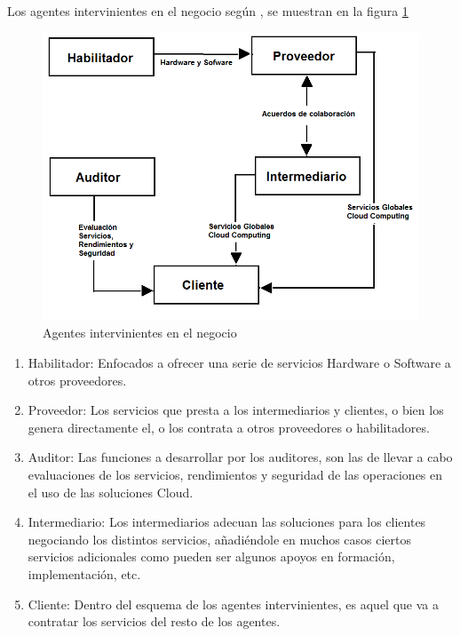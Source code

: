 \documentclass[a4paper, 12pt]{report}
\begin{document}
\begin{justify}
Los agentes intervinientes en el negocio seg\'un \cite{tratecno}, se muestran en la figura \ref{fig:agentesintervinientes}
\begin{figure}[ht]
	\begin{center}
		\includegraphics[width=.6\textwidth]{agentesintervinientes}
		\caption{Agentes intervinientes en el negocio \cite{tratecno}}
		\label{fig:agentesintervinientes}
	\end{center}
\end{figure}
\begin{enumerate}[label=\alph*)]
    \item{Habilitador:} Enfocados a ofrecer una serie de servicios Hardware o Software a otros proveedores.
    \item{Proveedor:} Los servicios que presta a los intermediarios y clientes, o bien los genera directamente el, o los contrata a otros proveedores o habilitadores.
    \item{Auditor:} Las funciones a desarrollar por los auditores, son las de llevar a cabo evaluaciones de los servicios, rendimientos y seguridad de las operaciones en el uso de las soluciones Cloud.
    \item{Intermediario:} Los intermediarios adecuan las soluciones para los clientes negociando los distintos servicios, añadiéndole en muchos casos ciertos servicios adicionales como pueden ser algunos apoyos en formación, implementación, etc.
    \item{Cliente:} Dentro del esquema de los agentes intervinientes, es aquel que va a contratar los servicios del resto de los agentes.
\end{enumerate}

\end{justify}

\vspace*{5em}
\end{document}
